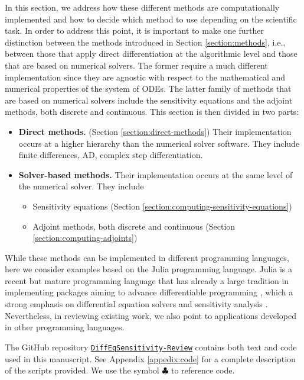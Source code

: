 
In this section, we address how these different methods are computationally implemented and how to decide which method to use depending on the scientific task.
In order to address this point, it is important to make one further distinction between the methods introduced in Section \ref{section:methods}, i.e., between those that apply direct differentiation at the algorithmic level and those that are based on numerical solvers.  
The former require a much different implementation since they are agnostic with respect to the mathematical and numerical properties of the system of ODEs.
The latter family of methods that are based on numerical solvers include the sensitivity equations and the adjoint methods, both discrete and continuous.
This section is then divided in two parts:
\begin{itemize}
    \item \textbf{Direct methods.} (Section \ref{section:direct-methods}) Their implementation occurs at a higher hierarchy than the numerical solver software. They include finite differences, AD, complex step differentiation.
    \item \textbf{Solver-based methods.} Their implementation occurs at the same level of the numerical solver. They include 
    \begin{itemize}
        \item Sensitivity equations (Section \ref{section:computing-sensitivity-equations})
        \item Adjoint methods, both discrete and continuous (Section \ref{section:computing-adjoints})
    \end{itemize}
\end{itemize}
While these methods can be implemented in different programming languages, here we consider examples based on the Julia programming language. 
Julia is a recent but mature programming language that has already a large tradition in implementing packages aiming to advance differentiable programming \cite{Bezanson_Karpinski_Shah_Edelman_2012, Julialang_2017}, which a strong emphasis on differential equation solvers \cite{Rackauckas_Nie_2016} and sensitivity analysis \cite{rackauckas2020universal}.
Nevertheless, in reviewing existing work, we also point to applications developed in other programming languages.

The GitHub repository \href{https://github.com/ODINN-SciML/DiffEqSensitivity-Review}{\texttt{DiffEqSensitivity-Review}} contains both text and code used in this manuscript. 
See Appendix \ref{appedix:code} for a complete description of the scripts provided. 
We use the symbol $\clubsuit$ to reference code. 